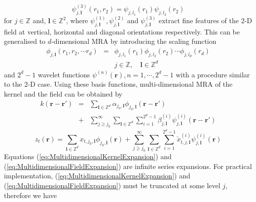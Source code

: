 \documentclass[journal,a4paper]{IEEEtran}
\begin{document}
\begin{equation}
 \psi_{j,\mathbf{l}}^{(3)}\left(r_1,r_2\right)=\psi_{j,l_1}\left(r_1\right)\psi_{j,l_2}\left(r_2\right)
\label{eq:2Dwavelet_3}
\end{equation}
for $j \in \mathbb{Z}$ and, $\mathbf{l} \in \mathbb{Z}^2$, where $\psi_{j,\mathbf{l}}^{(1)},  \psi_{j,\mathbf{l}}^{(2)}$ and $\psi_{j,\mathbf{l}}^{(3)} $ extract fine features of the 2-D field at vertical, horizontal and diagonal orientations respectively.
This can be generalised to $d$-dimensional MRA by introducing the scaling function
\setlength{\arraycolsep}{0.0em}
\begin{eqnarray}
  \phi_{j,\mathbf{l}}\left(r_1,r_2, \cdots r_d\right)&=&\phi_{j,l_1}\left(r_1\right)\phi_{j,l_2}\left(r_2\right) \cdots \phi_{j,l_d}\left(r_d\right) \label{eq:d-dimensionalscalingfunction}\\
 &&j \in \mathbb{Z}, \quad \mathbf{l} \in \mathbb{Z}^d \nonumber
\end{eqnarray}
\setlength{\arraycolsep}{5pt}
and $2^d-1$ wavelet functions $ \psi^{(n)} \left(\mathbf{r}\right), n=1, \cdots,2^d-1$ with a procedure similar to the 2-D case. Using these basis functions, multi-dimensional MRA of the kernel and the field can be obtained by
\setlength{\arraycolsep}{0.0em}
\begin{eqnarray}
 k\left(\mathbf{r}-\mathbf{r'}\right)&=&\sum_{\mathbf{l}\in \mathbb{Z}^d}\alpha_{j_0,\mathbf{l}}\phi_{j_0,\mathbf{l}}\left(\mathbf{r}-\mathbf{r'}\right) \nonumber \\
&+&\sum_{j\geq j_0}^{\infty} \sum_{\mathbf{l}\in \mathbb{Z}^d}\sum_{i=1}^{2^d-1}\beta_{j,\mathbf{l}}^{(i)} \psi_{j,\mathbf{l}}^{(i)}\left(\mathbf{r}-\mathbf{r'}\right) 
\label{eq:MultidimensionalKernelExpansion}
\end{eqnarray}
\setlength{\arraycolsep}{5pt}
\begin{equation}
z_t\left(\mathbf{r}\right)=\sum_{\mathbf{l}\in \mathbb{Z}^d}x_{t,j_{0},\mathbf{l}}\phi_{j_{0},\mathbf{l}}\left(\mathbf{r}\right)+\sum_{j\geq j_0}^{\infty} \sum_{\mathbf{l}\in \mathbb{Z}^d}\sum_{i=1}^{2^d-1} \check{x}_{t,j,\mathbf{l}}^{(i)}\psi_{j,\mathbf{l}}^{(i)}\left(\mathbf{r}\right)
\label{eq:MultidimensionalFieldExpansion}
\end{equation}
Equations (\ref{eq:MultidimensionalKernelExpansion}) and (\ref{eq:MultidimensionalFieldExpansion}) are infinite series expansions. For practical implementation, (\ref{eq:MultidimensionalKernelExpansion}) and (\ref{eq:MultidimensionalFieldExpansion}) must be truncated at some level $j$, therefore we have
\end{document}
